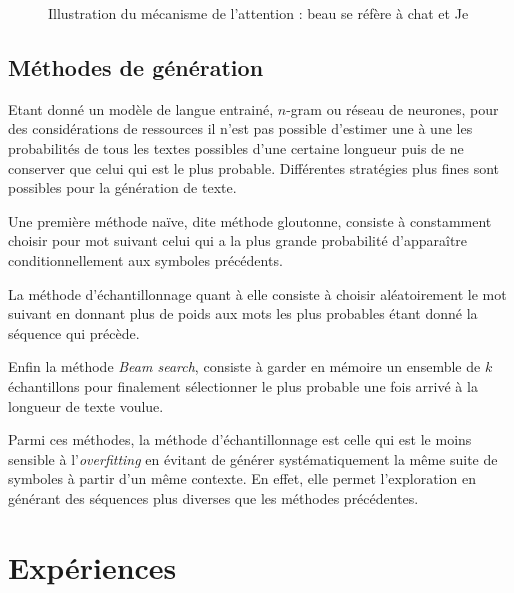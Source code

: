 \begin{figure}[h]
\begin{center}
\caption{Illustration du mécanisme de l'attention : \og beau \fg{} se réfère à \og chat \fg{} et \og Je \fg{}}
\end{center}
\end{figure}

\subsection{Méthodes de génération}

Etant donné un modèle de langue entrainé, $n$-gram ou réseau de neurones, pour des considérations de ressources il n'est pas possible d'estimer une à une les probabilités de tous les textes possibles d'une certaine longueur puis de ne conserver que celui qui est le plus probable. Différentes stratégies plus fines sont possibles pour la génération de texte.

Une première méthode naïve, dite méthode gloutonne, consiste à constamment choisir pour mot suivant celui qui a la plus grande probabilité d'apparaître conditionnellement aux symboles précédents. 

La méthode d'échantillonnage quant à elle consiste à choisir aléatoirement le mot suivant en donnant plus de poids aux mots les plus probables étant donné la séquence qui précède.

Enfin la méthode \textit{Beam search}, consiste à garder en mémoire un ensemble de $k$ échantillons pour finalement sélectionner le plus probable une fois arrivé à la longueur de texte voulue.

Parmi ces méthodes, la méthode d'échantillonnage est celle qui est le moins sensible à l'\textit{overfitting} en évitant de générer systématiquement la même suite de symboles à partir d'un même contexte. En effet, elle permet l'exploration en générant des séquences plus diverses que les méthodes précédentes.


\section{Expériences}

